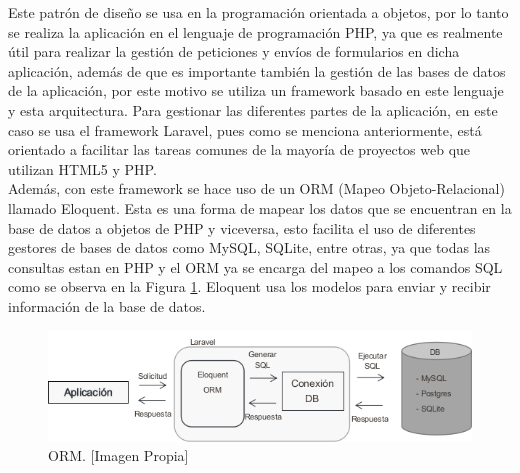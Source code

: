 Este patrón de diseño se usa en la programación orientada a objetos, por lo tanto se realiza la aplicación en el lenguaje de programación PHP, ya que es realmente útil para realizar la gestión de peticiones y envíos de formularios en dicha aplicación, además de que es importante también la gestión de las bases de datos de la aplicación, por este motivo se utiliza un framework basado en este lenguaje y esta arquitectura. Para gestionar las diferentes partes de la aplicación, en este caso se usa el framework Laravel, pues como se menciona anteriormente, está orientado a facilitar las tareas comunes de la mayoría de proyectos web que utilizan HTML5 y PHP.\\

Además, con este framework se hace uso de un ORM (Mapeo Objeto-Relacional) llamado Eloquent. Esta es una forma de mapear los datos que se encuentran en la base de datos a objetos de PHP y viceversa, esto facilita el uso de diferentes gestores de bases de datos como MySQL, SQLite, entre otras, ya que todas las consultas estan en PHP y el ORM ya se encarga del mapeo a los comandos SQL como se observa en la Figura \ref{fig:orm}. Eloquent usa los modelos para enviar y recibir información de la base de datos\cite{Eloq}.\\

\begin{figure}[H]
	\centering
	\caption[ORM]{ORM. [Imagen Propia]}
	\label{fig:orm}
	\includegraphics[width=0.7\linewidth]{Imagenes/ORM}
\end{figure}
